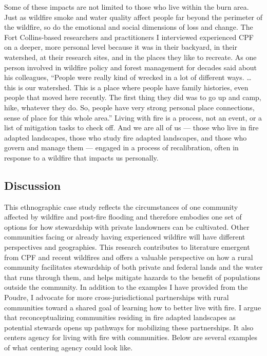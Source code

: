 \documentclass[
]{article}
\begin{document}
Some of these impacts are not limited to those who live within the burn area. Just as wildfire smoke and water quality affect people far beyond the perimeter of the wildfire, so do the emotional and social dimensions of loss and change. The Fort Collins-based researchers and practitioners I interviewed experienced CPF on a deeper, more personal level because it was in their backyard, in their watershed, at their research sites, and in the places they like to recreate. As one person involved in wildfire policy and forest management for decades said about his colleagues, ``People were really kind of wrecked in a lot of different ways. \ldots this is our watershed. This is a place where people have family histories, even people that moved here recently. The first thing they did was to go up and camp, hike, whatever they do. So, people have very strong personal place connections, sense of place for this whole area.'' Living with fire is a process, not an event, or a list of mitigation tasks to check off. And we are all of us --- those who live in fire adapted landscapes, those who study fire adapted landscapes, and those who govern and manage them --- engaged in a process of recalibration, often in response to a wildfire that impacts us personally.

\subsection{Discussion}\label{discussion-1}

This ethnographic case study reflects the circumstances of one community affected by wildfire and post-fire flooding and therefore embodies one set of options for how stewardship with private landowners can be cultivated. Other communities facing or already having experienced wildfire will have different perspectives and geographies. This research contributes to literature emergent from CPF and recent wildfires and offers a valuable perspective on how a rural community facilitates stewardship of both private and federal lands and the water that runs through them, and helps mitigate hazards to the benefit of populations outside the community. In addition to the examples I have provided from the Poudre, I advocate for more cross-jurisdictional partnerships with rural communities toward a shared goal of learning how to better live with fire. I argue that reconceptualizing communities residing in fire adapted landscapes as potential stewards opens up pathways for mobilizing these partnerships. It also centers agency for living with fire with communities. Below are several examples of what centering agency could look like.
\end{document}
